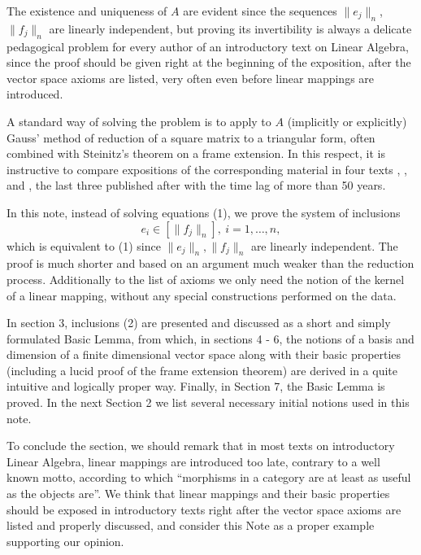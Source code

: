 \documentclass[]{amsart}
\begin{document}
\noindent
 The existence and uniqueness of   $A$ are evident since the sequences $\|e_j\|_n$, $\|f_j\|_n$ are linearly independent, but proving its invertibility is always a deli\-cate pedagogical problem for every author of an introductory text on Linear Algebra, since the proof should be given right at the beginning of the exposi\-tion, after the vector space axioms are listed, 
 very often  {even} before linear mappings are introduced.
 
 \noindent
 A standard way of solving the problem is  to apply  to $A$ (implicitly or explici\-tly) Gauss' method of reduction of a square matrix to a triangular form, often combi\-ned with Steinitz's theorem on a frame extension. In this respect, it is instructive to compare   expositions of the  corresponding material in four texts 
 \cite{Algebra1}, \cite{Algebra2}, \cite{Algebra3} and \cite{Algebra4}, the last three published after \cite{Algebra1} with the time lag of more than 50 years.

\noindent
In this 
{
 {note,}}    
instead of solving   equations (1),   we prove the system of inclu\-sions
\begin{equation}
e_i\in [\|f_j\|_n],\ i=1,\ldots,n,
\end{equation}
  which is equivalent to (1) since $\|e_j\|_n, \|f_j\|_n$ are linearly independent.
 The proof is much shorter and   based on an argument much weaker than the reduction process. 
  {Additionally}  
to the list of axioms we only need the notion of the kernel of a linear mapping, without any special constructions performed on the data.
 
 
\noindent
{

In section 3, inclusions (2) are presented and discussed as a short and simply formulated Basic Lemma, from which, in sections 4 - 6, the notions of a basis and dimension of a finite dimensional vector space 
along with their basic properties (including a lucid proof of the frame extension theorem) 
are derived in a quite intuitive and logically proper way. Finally, in Section 7, the Basic Lemma is proved. In the next Section 2 we list several necessary initial notions used in this note. 	
}








\noindent
To conclude the section, we should remark that in most texts on introductory Linear Algebra, linear mappings are introduced  too late, contrary to a   well known motto, according to which ``morphisms in a category are at least as useful as the objects are''.   We think that   linear mappings and   their basic properties should be exposed in introductory texts   right after the   vector space axioms are listed   and   properly discussed, and consider this Note as a proper example supporting our opinion.
\end{document}
